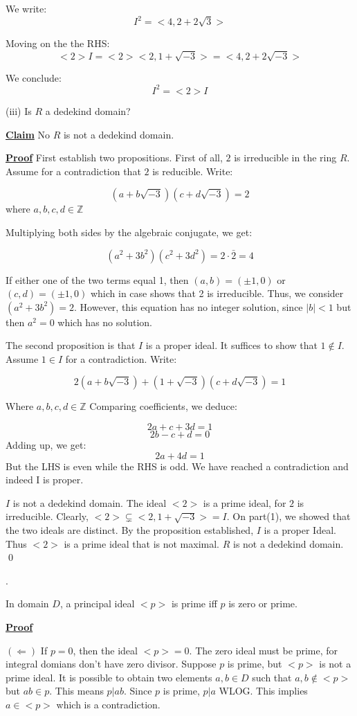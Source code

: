 \documentclass{article}
\newcommand{\new}[1]{
    \vspace{2mm}
    \noindent
    \textbf{
    \underline{#1}}
}
\newcounter{problemcnt}
\newcommand{\Problem}{{
    \vspace{5mm}
    \stepcounter{problemcnt}
    \noindent
    \arabic{problemcnt}. 
}
}
\newcommand{\Proof}{{
    \vspace{2mm}
    \noindent
    \textbf{
    \underline{Proof}}
}
}
\begin{document}
We write:
\[
    I^2 = <4, 2+2\sqrt{3}>
\]

Moving on the the RHS:
\[
    <2>I = <2><2, 1+\sqrt{-3}> = <4, 2+2\sqrt{-3}>
\]

We conclude:
\[
    I^2 = <2>I
\]

(iii) Is $R$ a dedekind domain?

\new{Claim} No $R$ is not a dedekind domain.

\Proof First establish two propositions. 
First of all, $2$ is irreducible in the 
ring $R$. Assume for a contradiction that 
$2$ is reducible. Write:

\[
    (a + b\sqrt{-3}) 
    (c + d\sqrt{-3})
    = 2
\]
where $a, b, c, d \in \mathbb{Z}$

Multiplying both sides by the algebraic 
conjugate, we get:

\[
    (a^2+3b^2)(c^2+3d^2) = 2 \cdot
    \bar{2} = 4
\]

If either one of the two terms equal 1, 
then $(a, b) = (\pm1, 0)$ 
or $(c, d) = (\pm1, 0)$
which in case shows that 2 is irreducible. 
Thus, we consider 
$(a^2+3b^2) = 2$. 
However, this equation has no integer solution,
since $|b| < 1$ but then $a^2 = 0$ which has 
no solution. 

The second proposition is that $I$ is 
a proper ideal. It suffices to show 
that $1 \notin I$. Assume $1 \in I$ 
for a contradiction. Write:

\[
    2(a+b\sqrt{-3})+(1+\sqrt{-3})
    (c+d\sqrt{-3}) = 1
\]

Where $a, b, c, d \in \mathbb{Z}$
Comparing coefficients, we deduce:

\[
    2a+c+3d = 1
\]
\[
    2b-c+d = 0
\]
Adding up, we get:
\[
    2a+4d = 1
\]
But the LHS is even while the RHS is odd. We 
have reached a contradiction and indeed I is proper. 

$I$ is not a dedekind domain. The ideal 
$<2>$ is a prime ideal, for $2$ is irreducible. 
Clearly, $<2> \subsetneq <2, 1+\sqrt{-3}> = I$. 
On part(1), we showed that the two ideals are 
distinct. By the proposition established, $I$ 
is a proper Ideal. Thus $<2>$ is a prime ideal 
that is not maximal. $R$ is not a dedekind domain. 
\qed



\Problem
In domain $D$, a principal ideal $<p>$ 
is prime iff $p$ is zero or prime. 

\Proof
$(\Leftarrow)$
If $p = 0$, then the ideal $<p> = {0}$. 
The zero ideal must be prime, for integral 
domians don't have zero divisor. Suppose 
$p$ is prime, but $<p>$ is not a prime ideal. 
It is possible to obtain two elements $a, b \in D$
such that $a, b \notin <p>$ but $ab \in p$.
This means $p|ab$.  
Since $p$ is prime, $p|a$ WLOG. 
This implies $a \in <p>$ which is a contradiction. 
\end{document}
